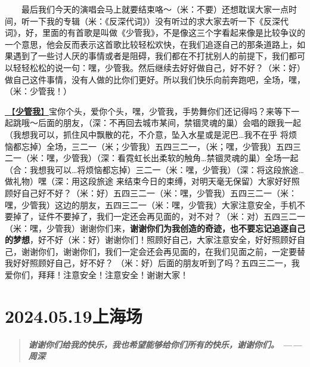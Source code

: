 \documentclass[]{ctexbook}
\begin{document}
  最后我们今天的演唱会马上就要结束咯～（米：不要）还想耽误大家一点时间，听一下我的专辑（米：《反深代词》）没有听过的求大家去听一下《反深代词》，好，里面的有首歌是叫做《少管我》，不是像这三个字看起来像是比较争议的一个意思，他会反而表示这首歌比较轻松欢快，在我们追逐自己的那条道路上，如果遇到了一些讨人厌的事情或者是阻碍，我们都在不打扰别人的前提下，我们都可以轻轻松松的说一句：嘿，少管我。然后继续去好好做自己，好不好？（米：好）做自己这件事情，没有人做的比你们更好。所以我们快乐向前奔跑吧，全场，嘿，（米：少管我！）

\hyperref[watch-ur-manners]{🎵【\textbf{少管我}】}宝你个头，爱你个头，嘿，少管我，手势舞你们还记得吗？来等下一起跳哦～后面的朋友，（深：不再回去城市某间，禁锢灵魂的巢）会唱的跟我一起（我想我可以，抓住风中飘散的花，不介意，坠入水星或是泥巴\ldots 我不在乎 将烦恼都忘掉）全场，三二一（米；少管我）五四三二一，（米；嘿，少管我）五四三二一（米：嘿，少管我）（深：看霓虹长出柔软的触角\ldots 禁锢灵魂的巢）全场一起（合：我想我可以\ldots 将烦恼都忘掉）三二一（米：嘿，少管我）（深：将这段旅途\ldots 做礼物）嘿（深：用这段旅途 来结束今日的束缚，对明天毫无保留）大家好好照顾好自己好不好？（米：好）五四三二一（米：嘿，少管我）五四三二一（米：嘿，少管我）这边的朋友，五四三二一（米：嘿，少管我）大家注意安全，手机不要掉了，证件不要掉了，我们一定还会再见面的，对不对？（米：对）五四三二一（米：嘿，少管我）谢谢你们来，\textbf{谢谢你们为我创造的奇迹，也不要忘记追逐自己的梦想}，好不好（米：好）谢谢你们！照顾好自己，大家注意安全，好好照顾好自己，谢谢你们，谢谢你们，我们一定会还会再见面的，在我们见面之前，一定要替我好好照顾好自己，好不好？ （米：好）后面的朋友听到了吗？五四三二一，我爱你们，拜拜！注意安全！注意安全！谢谢大家！

\chapter{2024.05.19上海场}\label{shanghai-20240519}

\begin{quote}
\textbf{\emph{谢谢你们给我的快乐，我也希望能够给你们所有的快乐，谢谢你们。 ------ 周深}}
\end{quote}
\end{document}
